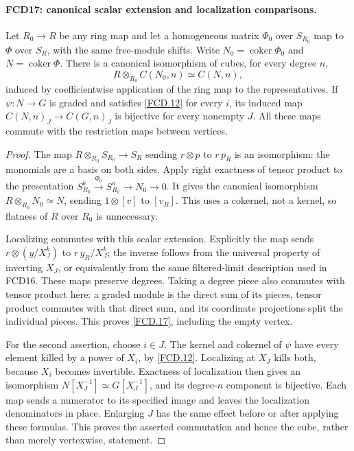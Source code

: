 \paragraph{FCD17: canonical scalar extension and localization comparisons.}
\label{claim:FCD17}
Let $R_0\to R$ be any ring map and let a homogeneous matrix
$\Phi_0$ over $S_{R_0}$ map to $\Phi$ over $S_R$, with the
same free-module shifts.  Write $N_0=\operatorname{coker}\Phi_0$
and $N=\operatorname{coker}\Phi$.  There is a canonical
isomorphism of cubes, for every degree $n$,
\[
 R\otimes_{R_0} C(N_0,n)\simeq C(N,n),               \tag{FCD.17}\label{FCD.17}
\]
induced by coefficientwise application of the ring map to the
representatives.  If $\psi:N\to G$ is graded and satisfies
\eqref{FCD.12} for every $i$, its induced map
$C(N,n)_J\to C(G,n)_J$ is bijective for every nonempty $J$.
All these maps commute with the restriction maps between vertices.

\begin{proof}
The map $R\otimes_{R_0}S_{R_0}\to S_R$ sending
$r\otimes p$ to $r\,p_R$ is an isomorphism: the monomials
are a basis on both sides.  Apply right exactness of tensor
product to the presentation
$S_{R_0}^b\xrightarrow{\Phi_0}S_{R_0}^a\to N_0\to0$.
It gives the canonical isomorphism
$R\otimes_{R_0}N_0\simeq N$, sending
$1\otimes[v]$ to $[v_R]$.  This uses a cokernel, not a
kernel, so flatness of $R$ over $R_0$ is unnecessary.

Localizing commutes with this scalar extension.  Explicitly the
map sends $r\otimes(y/X_J^k)$ to $r\,y_R/X_J^k$;
the inverse follows from the universal property of inverting
$X_J$, or equivalently from the same filtered-limit description
used in FCD16.  These maps preserve degrees.  Taking a degree
piece also commutes with tensor product here: a graded module
is the direct sum of its pieces, tensor product commutes with
that direct sum, and its coordinate projections split the
individual pieces.  This proves \eqref{FCD.17}, including the
empty vertex.

For the second assertion, choose $i\in J$.  The kernel and
cokernel of $\psi$ have every element killed by a power of
$X_i$, by \eqref{FCD.12}.  Localizing at $X_J$ kills both,
because $X_i$ becomes invertible.  Exactness of localization
then gives an isomorphism $N[X_J^{-1}]\simeq G[X_J^{-1}]$,
and its degree-$n$ component is bijective.
Each map sends a numerator to its specified image and leaves
the localization denominators in place.  Enlarging $J$ has
the same effect before or after applying these formulas.
This proves the asserted commutation and hence the cube,
rather than merely vertexwise, statement.
\end{proof}

